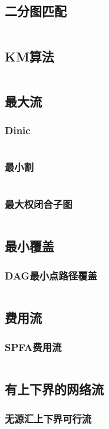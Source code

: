\documentclass[a4paper,11pt]{article}
\begin{document}
\subsection{二分图匹配}
\inputminted[breaklines]{c++}{图论/二分图匹配.cpp}
\subsection{KM算法}
\inputminted[breaklines]{c++}{图论/KM算法.cpp}
\subsection{最大流}
\subsubsection{Dinic}
\inputminted[breaklines]{c++}{图论/Dinic.cpp}
\subsubsection{最小割}
\inputminted[breaklines]{c++}{图论/最小割.cpp}
\subsubsection{最大权闭合子图}
\inputminted[breaklines]{c++}{图论/最大权闭合子图.cpp}
\subsection{最小覆盖}
\subsubsection{DAG最小点路径覆盖}
\inputminted[breaklines]{c++}{图论/最小点路径覆盖.cpp}
\subsection{费用流}
\subsubsection{SPFA费用流}
\inputminted[breaklines]{c++}{图论/SPFA费用流.cpp} 

\subsection{有上下界的网络流}
\subsubsection{无源汇上下界可行流}
\inputminted[breaklines]{c++}{图论/无源汇上下界可行流.cpp} 
\end{document}
